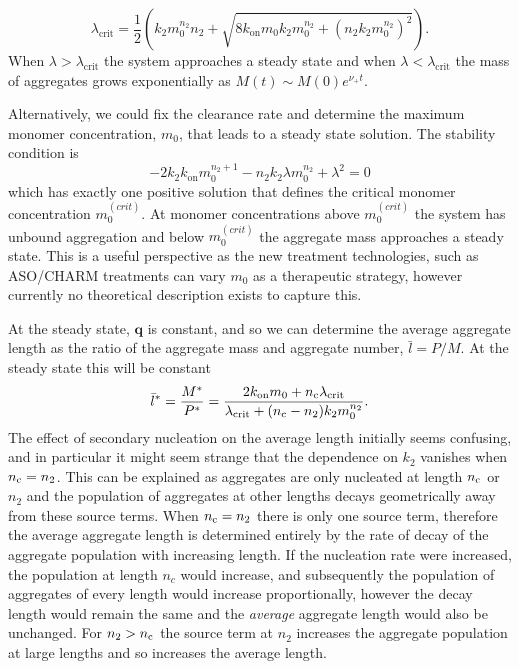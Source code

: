 \begin{equation}
    \lambda_{\text{crit}} = \frac{1}{2} \left(k_2 m_0^{n_2} n_2 + \sqrt{8 k_\text{on} m_0 k_2 m_0^{n_2} + \left(n_2 k_2 m_0^{n_2}\right)^2}\right).
    \label{eq:2-critclear}
\end{equation}
 When $\lambda>\lambda_{\text{crit}}$ the system approaches a steady state and when $\lambda<\lambda_{\text{crit}}$ the mass of aggregates grows exponentially as $M(t)\sim M(0)e^{\nu_+ t}$.

Alternatively, we could fix the clearance rate and determine the maximum monomer concentration, $m_0$, that leads to a steady state solution. The stability condition is
\begin{equation}
    -2 k_2 k_\text{on} m_0^{n_2+1} - n_2 k_2 \lambda m_0^{n_2} +\lambda^2 = 0
    \label{eq:2-critmon}
\end{equation}
which has exactly one positive solution that defines the critical monomer concentration $m_0^{(crit)}$. At monomer concentrations above $m_0^{(crit)}$ the system has unbound aggregation and below $m_0^{(crit)}$ the aggregate mass approaches a steady state. This is a useful perspective as the new treatment technologies, such as ASO/CHARM treatments can vary $m_0$ as a therapeutic strategy, however currently no theoretical description exists to capture this.

At the steady state, $\textbf{q}$ is constant, and so we can determine the average aggregate length as the ratio of the aggregate mass and aggregate number, $\bar{l}=P/M$. At the steady state this will be constant
\begin{equation}
    \bar{l}^* = \frac{M^*}{P^*} = \frac{2 k_\text{on} m_0 + n_{\mathrm{c}} \lambda_{\text{crit}}}{\lambda_{\text{crit}}+(n_{\mathrm{c}}-n_2)k_2 m_0^{n_2}}.
    \label{eq:4-lbarConstClear}
\end{equation}
The effect of secondary nucleation on the average length initially seems confusing, and in particular it might seem strange that the dependence on $k_2$ vanishes when $n_{\mathrm{c}}=n_2$. This can be explained as aggregates are only nucleated at length $n_{\mathrm{c}}$ or $n_2$ and the population of aggregates at other lengths decays geometrically away from these source terms. When $n_{\mathrm{c}} = n_2$ there is only one source term, therefore the average aggregate length is determined entirely by the rate of decay of the aggregate population with increasing length. If the nucleation rate were increased, the population at length $n_c$ would increase, and subsequently the population of aggregates of every length would increase proportionally, however the decay length would remain the same and the \textit{average} aggregate length would also be unchanged. For $n_2>n_{\mathrm{c}}$ the source term at $n_2$ increases the aggregate population at large lengths and so increases the average length.

